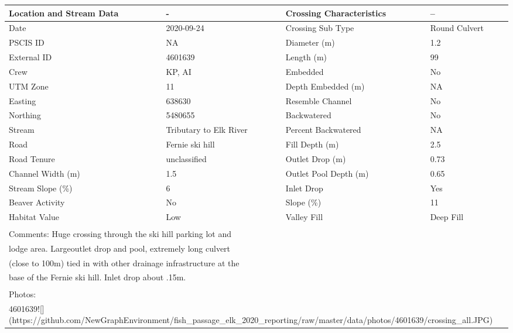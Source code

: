 \documentclass[
]{book}
\begin{document}
\begin{tabular}{l|l|l|l}
\hline
Location and Stream Data & - & Crossing Characteristics & --\\
\hline
Date & 2020-09-24 & Crossing Sub Type & Round Culvert\\
\hline
PSCIS ID & NA & Diameter (m) & 1.2\\
\hline
External ID & 4601639 & Length (m) & 99\\
\hline
Crew & KP, AI & Embedded & No\\
\hline
UTM Zone & 11 & Depth Embedded (m) & NA\\
\hline
Easting & 638630 & Resemble Channel & No\\
\hline
Northing & 5480655 & Backwatered & No\\
\hline
Stream & Tributary to Elk River & Percent Backwatered & NA\\
\hline
Road & Fernie ski hill & Fill Depth (m) & 2.5\\
\hline
Road Tenure & unclassified & Outlet Drop (m) & 0.73\\
\hline
Channel Width (m) & 1.5 & Outlet Pool Depth (m) & 0.65\\
\hline
Stream Slope (\%) & 6 & Inlet Drop & Yes\\
\hline
Beaver Activity & No & Slope (\%) & 11\\
\hline
Habitat Value & Low & Valley Fill & Deep Fill\\
\hline
\multicolumn{4}{l}{\textsuperscript{} Comments: Huge crossing through the ski hill parking lot and}\\
\multicolumn{4}{l}{lodge area.  Largeoutlet drop and pool, extremely long culvert}\\
\multicolumn{4}{l}{(close to 100m) tied in with other drainage infrastructure at the}\\
\multicolumn{4}{l}{base of the Fernie ski hill. Inlet drop about .15m.}\\
\multicolumn{4}{l}{\textsuperscript{} Photos:}\\
\multicolumn{4}{l}{4601639![](https://github.com/NewGraphEnvironment/fish\_passage\_elk\_2020\_reporting/raw/master/data/photos/4601639/crossing\_all.JPG)}\\
\end{tabular}
\end{document}
